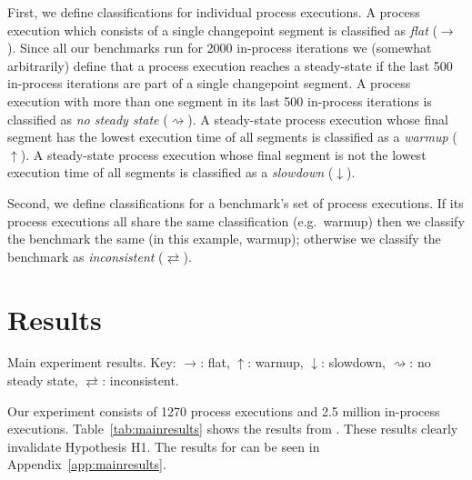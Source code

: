 \documentclass[preprint,numbers,10pt]{sigplanconf}
\newcommand{\flatc}{$\rightarrow$}
\newcommand{\nosteadystate}{$\rightsquigarrow$}
\newcommand{\warmup}{$\uparrow$}
\newcommand{\slowdown}{$\downarrow$}
\newcommand{\inconsistent}{$\rightleftarrows$}
\begin{document}
First, we define classifications for individual process executions. A process
execution which consists of a single changepoint segment is classified as
\emph{flat} (\flatc). Since all our benchmarks run for 2000 in-process
iterations we (somewhat arbitrarily) define that a process execution reaches a
steady-state if the last 500 in-process iterations are part of a single
changepoint segment. A process execution with more than one segment in its last
500 in-process iterations is classified as \emph{no steady state}
(\nosteadystate). A steady-state process execution whose final segment has
the lowest execution time of all segments is classified as a \emph{warmup}
(\warmup). A steady-state process execution whose final segment is not the
lowest execution time of all segments is classified as a \emph{slowdown}
(\slowdown).

Second, we define classifications for a benchmark's set of process executions.
If its process executions all share the same classification (e.g.~warmup) then
we classify the benchmark the same (in this example, warmup); otherwise we classify the benchmark as
\emph{inconsistent} (\inconsistent).


\section{Results}
\label{sec:Results}

\begin{table}[t]
\centering
\begin{minipage}{.48\textwidth}

\end{minipage}
\begin{minipage}{.48\textwidth}

\end{minipage}
\caption{Main experiment results. Key: \flatc: flat, \warmup: warmup, \slowdown:
slowdown, \nosteadystate: no steady state, \inconsistent: inconsistent.}
\label{tab:mainresults}
\end{table}

%

Our experiment consists of 1270 process executions and 2.5 million in-process
executions. Table~\ref{tab:mainresults} shows the results from .
 These results
clearly invalidate Hypothesis H1. The results for 
can be seen in Appendix~\ref{app:mainresults}. 
\end{document}
